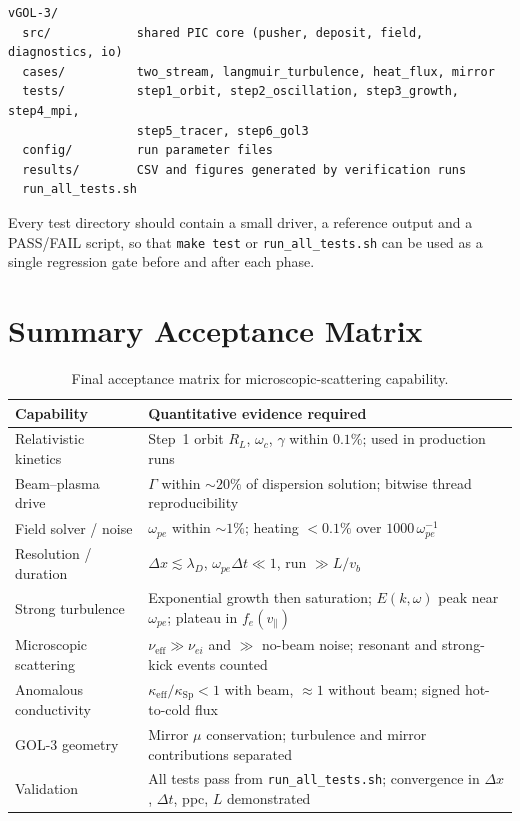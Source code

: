 \documentclass[11pt,a4paper]{article}
\begin{document}
\begin{lstlisting}
vGOL-3/
  src/            shared PIC core (pusher, deposit, field, diagnostics, io)
  cases/          two_stream, langmuir_turbulence, heat_flux, mirror
  tests/          step1_orbit, step2_oscillation, step3_growth, step4_mpi,
                  step5_tracer, step6_gol3
  config/         run parameter files
  results/        CSV and figures generated by verification runs
  run_all_tests.sh
\end{lstlisting}

Every test directory should contain a small driver, a reference output and a PASS/FAIL script, so
that \texttt{make test} or \texttt{run\_all\_tests.sh} can be used as a single regression gate
before and after each phase.

\section{Summary Acceptance Matrix}

\begin{table}[h]
\centering
\begin{tabular}{p{}p{}}
\toprule
\textbf{Capability} & \textbf{Quantitative evidence required} \\
\midrule
Relativistic kinetics & Step~1 orbit $R_L$, $\omega_c$, $\gamma$ within $0.1\%$; used in production runs \\
\midrule
Beam--plasma drive & $\Gamma$ within $\sim20\%$ of dispersion solution; bitwise thread reproducibility \\
\midrule
Field solver / noise & $\omega_{pe}$ within $\sim1\%$; heating $<0.1\%$ over $1000\,\omega_{pe}^{-1}$ \\
\midrule
Resolution / duration & $\Delta x\lesssim\lambda_D$, $\omega_{pe}\Delta t\ll1$, run $\gg L/v_b$ \\
\midrule
Strong turbulence & Exponential growth then saturation; $E(k,\omega)$ peak near $\omega_{pe}$; plateau in $f_e(v_\parallel)$ \\
\midrule
Microscopic scattering & $\nu_{\mathrm{eff}}\gg\nu_{ei}$ and $\gg$ no-beam noise; resonant and strong-kick events counted \\
\midrule
Anomalous conductivity & $\kappa_{\mathrm{eff}}/\kappa_{\mathrm{Sp}}<1$ with beam, $\approx1$ without beam; signed hot-to-cold flux \\
\midrule
GOL-3 geometry & Mirror $\mu$ conservation; turbulence and mirror contributions separated \\
\midrule
Validation & All tests pass from \texttt{run\_all\_tests.sh}; convergence in $\Delta x$, $\Delta t$, ppc, $L$ demonstrated \\
\bottomrule
\end{tabular}
\caption{Final acceptance matrix for microscopic-scattering capability.}
\end{table}
\end{document}

